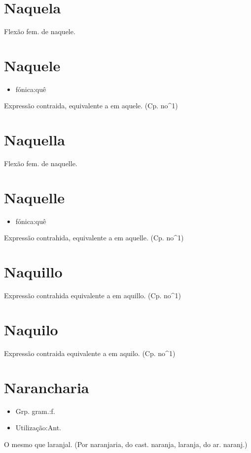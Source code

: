 \section{Naquela}
Flexão fem. de naquele.
\section{Naquele}
\begin{itemize}
\item {fónica:quê}
\end{itemize}
Expressão contraida, equivalente a \textunderscore em aquele\textunderscore .
(Cp. \textunderscore no\textunderscore ^1)
\section{Naquella}
Flexão fem. de naquelle.
\section{Naquelle}
\begin{itemize}
\item {fónica:quê}
\end{itemize}
Expressão contrahida, equivalente a \textunderscore em aquelle\textunderscore .
(Cp. no^1)
\section{Naquillo}
Expressão contrahida equivalente a \textunderscore em aquillo\textunderscore .
(Cp. \textunderscore no\textunderscore ^1)
\section{Naquilo}
Expressão contraida equivalente a \textunderscore em aquilo\textunderscore .
(Cp. \textunderscore no\textunderscore ^1)
\section{Narancharia}
\begin{itemize}
\item {Grp. gram.:f.}
\end{itemize}
\begin{itemize}
\item {Utilização:Ant.}
\end{itemize}
O mesmo que \textunderscore laranjal\textunderscore .
(Por \textunderscore naranjaria\textunderscore , do cast. \textunderscore naranja\textunderscore , laranja, do ar. \textunderscore naranj\textunderscore .)
